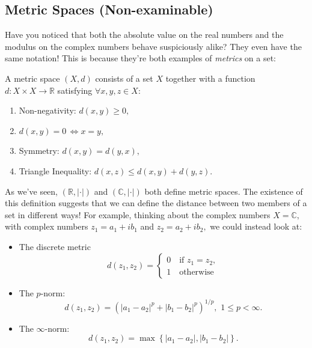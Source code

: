 \documentclass[
  12pt,
  a4paper]{extarticle}
\providecommand{\tightlist}{%
  \setlength{\itemsep}{0pt}\setlength{\parskip}{0pt}}
\theoremstyle{plain}
\theoremstyle{definition}
\theoremstyle{plain}
\theoremstyle{plain}
\theoremstyle{plain}
\theoremstyle{plain}
\theoremstyle{definition}
\theoremstyle{definition}
\theoremstyle{remark}
\theoremstyle{remark}
\let\BeginKnitrBlock\begin \let\EndKnitrBlock\end
\renewcommand{\;}{\,}
\begin{document}
\hypertarget{metric-spaces-non-examinable}{%
\subsection{Metric Spaces (Non-examinable)}\label{metric-spaces-non-examinable}}

Have you noticed that both the absolute value on the real numbers and the modulus on the complex numbers behave suspiciously alike? They even have the same notation! This is because they're both examples of \emph{metrics} on a set:

\BeginKnitrBlock{definition}[Metric Space]
{\label{def:def3} }A metric space \((X,d)\) consists of a set \(X\) together with a function \(d: X\times X \to \mathbb{R}\) satisfying \(\forall x,y,z \in X:\)

\begin{enumerate}
\def\labelenumi{\roman{enumi})}
\tightlist
\item
  Non-negativity: \(d(x,y) \geq 0,\)
\item
  \(d(x,y) = 0 \; \Leftrightarrow x = y,\)
\item
  Symmetry: \(d(x,y) = d(y,x),\)
\item
  Triangle Inequality: \(d(x,z) \leq d(x,y) + d(y,z).\)
\end{enumerate}
\EndKnitrBlock{definition}

As we've seen, \((\mathbb{R}, \lvert \cdot \rvert)\) and \((\mathbb{C}, \lvert \cdot \rvert)\) both define metric spaces. The existence of this definition suggests that we can define the distance between two members of a set in different ways! For example, thinking about the complex numbers \(X = \mathbb{C},\) with complex numbers \(z_1 = a_1 + ib_1\) and \(z_2 = a_2 + ib_2,\) we could instead look at:

\begin{itemize}
\tightlist
\item
  The discrete metric \[d(z_1,z_2) = \begin{cases} 0 \quad \text{if $z_1=z_2$},\\
  1 \quad \text{otherwise}\end{cases}\]
\item
  The \(p\)-norm: \[d(z_1,z_2) = \left(\lvert a_1-a_2\rvert^p + \lvert b_1-b_2\rvert ^p\right)^{1/p},\;\; 1\leq p < \infty.\]
\item
  The \(\infty\)-norm: \[d(z_1,z_2) = \max\left\lbrace \lvert a_1 - a_2 \rvert, \lvert b_1 - b_2 \rvert\right\rbrace.\]
\end{itemize}
\end{document}
